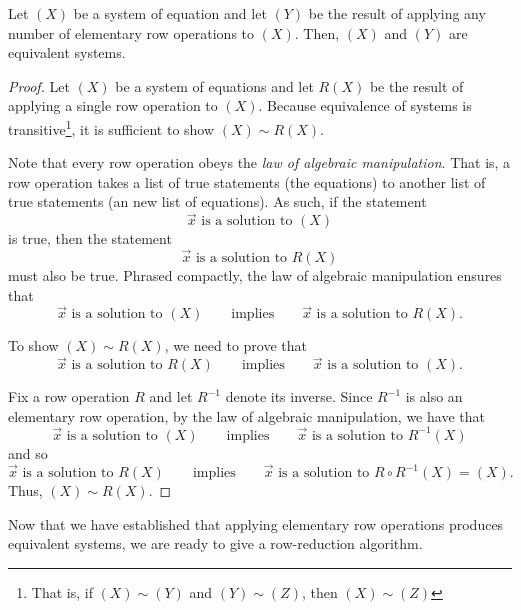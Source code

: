 \begin{theorem}
	Let $(X)$ be a system of equation and let $(Y)$ be
	the result of applying any number of elementary
	row operations to $(X)$.  Then, $(X)$ and $(Y)$ are equivalent systems.
\end{theorem}
\begin{proof}
	Let $(X)$ be a system of equations and let $R(X)$ be the result of applying
	a single row operation to $(X)$.
	Because equivalence of systems is transitive\footnote{ That
	is, if $(X)\sim(Y)$ and $(Y)\sim(Z)$, then $(X)\sim (Z)$}, it is sufficient
	to show $(X)\sim R(X)$.

	Note that every row operation obeys the \emph{law of algebraic manipulation}.
	That is, a row operation takes a list of true statements (the equations) to another 
	list of true statements (an new list of equations). As such, if the statement
	\[
		\vec x\text{ is a solution to }(X)
	\]
	is true, then the statement 
	\[
		\vec x\text{ is a solution to }R(X)
	\]
	must also be true.  Phrased compactly, the law of algebraic manipulation
	ensures that
	\[
		\vec x\text{ is a solution to }(X)\qquad \text{implies}
		\qquad \vec x\text{ is a solution to }R(X).
	\]

	To show $(X)\sim R(X)$, we need to prove that
	\[
		\vec x\text{ is a solution to }R(X)\qquad \text{implies}
		\qquad \vec x\text{ is a solution to }(X).
	\]
	
	Fix a row operation $R$ and let $R^{-1}$ denote its inverse. Since
	$R^{-1}$ is also an elementary row operation, by the law of
	algebraic manipulation, we have that
	\[
		\vec x\text{ is a solution to }(X)\qquad \text{implies}
		\qquad \vec x\text{ is a solution to }R^{-1}(X)
	\]
	and so
	\[
		\vec x\text{ is a solution to }R(X)\qquad \text{implies}
		\qquad \vec x\text{ is a solution to }R\circ R^{-1}(X) = (X).
	\]
	Thus, $(X)\sim R(X)$.
\end{proof}

Now that we have established that applying elementary row operations produces
equivalent systems, we are ready to give a row-reduction algorithm.

